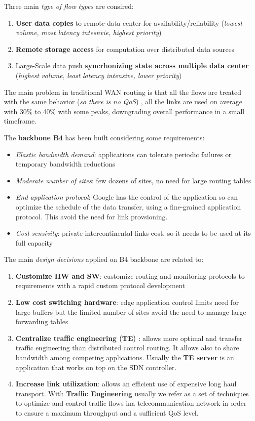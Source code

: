 \documentclass[10pt,a4paper]{report}
\theoremstyle{definition}
\begin{document}
Three main \textit{type of flow types} are consired:
\begin{enumerate}
	\item 
	\textbf{User data copies} to remote data center for availability/reliability (\textit{lowest volume, most latency intesnvie, highest priority})
	\item 
	\textbf{Remote storage access} for computation over distributed data sources
	\item 
	Large-Scale data push \textbf{syncrhonizing state across multiple data center} (\textit{highest volume, least latency intensive, lower priority})
\end{enumerate}

The main problem in traditional WAN routing is that all the flows are treated with the same behavior (\textit{so there is no QoS}) , all the links are used on average with 30\% to 40\% with some peaks, downgrading overall performance in a small timeframe.

The \textbf{backbone B4} has been built considering some requirements:
\begin{itemize}
	\item 
	\textit{Elastic bandwidth demand}: applications can tolerate periodic failures or temporary bandwidth reductions
	\item 
	\textit{Moderate number of sites}: few dozens of sites, no need for large routing tables
	\item 
	\textit{End application protocol}: Google has the control of the application so can optimize the schedule of the data transfer, using a fine-grained application protocol. This avoid the need for link provsioning.
	\item 
	\textit{Cost sensivity}: private intercontinental links cost, so it needs to be used at its full capacity
\end{itemize}

The main \textit{design decisions} applied on B4 backbone are related to:
\begin{enumerate}
	\item 
	\textbf{Customize HW and SW}: customize routing and monitoring protocols to requirements with a rapid custom protocol development
	\item 
	\textbf{Low cost switching hardware}: edge application control limits need for large buffers but the limited number of sites avoid the need to manage large forwarding tables
	\item 
	\textbf{Centralize traffic engineering (TE)} : allows more optimal and transfer traffic engineering than distributed control routing. It allows also to share bandwidth among competing applications. Usually the \textbf{TE server} is an application that works on top on the SDN controller.
	\item 
	\textbf{Increase link utilization}: allows an efficient use of expensive long haul transport.
	With \textbf{Traffic Engineering} usually we refer as a set of techniques to
	optimize and control traffic flows ina telecommunication network in
	order to ensure a maximum throughput and a sufficient QoS level.
\end{enumerate}
\end{document}

